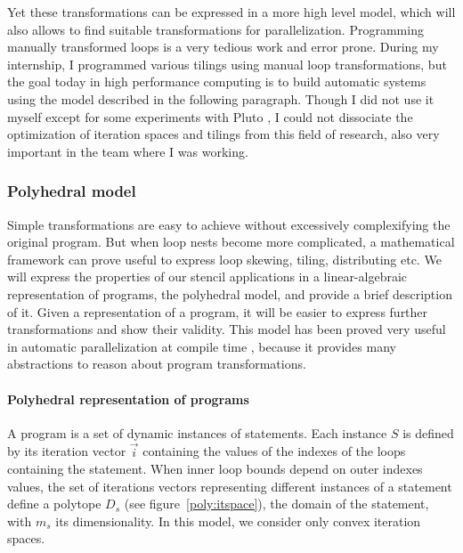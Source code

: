 \documentclass[a4paper,11pt]{article}
\begin{document}
Yet these transformations can be expressed in a more high level model, which will also
allows to find suitable transformations for parallelization. Programming manually transformed 
loops is a very tedious work and error prone. During my internship, I programmed
various tilings using manual loop transformations, but the goal today in high performance computing 
is to build automatic systems using the model described in the following paragraph.
Though I did not use it myself except for some experiments with Pluto \cite{bondhugula_automatic_2008}, 
I could not dissociate the optimization of iteration spaces
and tilings from this field of research, also very important in the team where I was working.

\subsubsection{Polyhedral model}
Simple transformations are easy to achieve without excessively complexifying the original
program. But when loop nests become more complicated, a mathematical framework can
prove useful to express loop skewing, tiling, distributing etc. We will express the properties
of our stencil applications in a linear-algebraic representation of programs, the polyhedral
model, and provide a brief description of it. Given a representation of a program, it will
be easier to express further transformations and show their validity.
This model has been proved very useful in automatic parallelization at compile time
\cite{bastoul_code_2004},
because it provides many abstractions to reason about program transformations.

\paragraph{Polyhedral representation of programs} A program is a set of dynamic instances
of statements. Each instance $S$ is defined by its iteration vector $\vec{i}$ containing the values
of the indexes of the loops containing the statement. When inner loop bounds depend
on outer indexes values, the set of iterations vectors representing different instances of a
statement define a polytope $D_s$ (see figure~\ref{poly:itspace}), the domain of the statement, with 
$m_s$ its dimensionality. In this model, we consider only convex iteration spaces.
\end{document}
